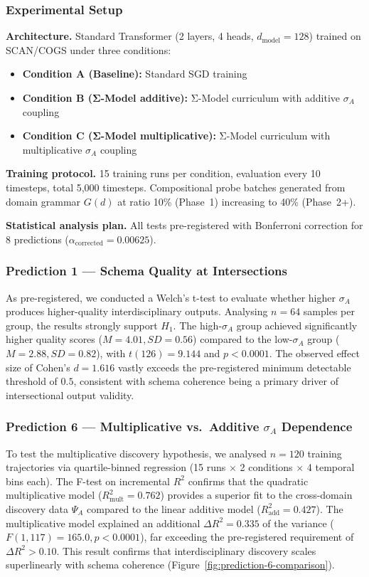 \documentclass[10pt]{article}
\begin{document}
\subsubsection{Experimental Setup}

\textbf{Architecture.} Standard Transformer (2 layers, 4 heads,
$d_{\text{model}}=128$) trained on SCAN/COGS under three conditions:
\begin{itemize}[nosep]
\item \textbf{Condition A (Baseline):} Standard SGD training
\item \textbf{Condition B (Σ-Model additive):} Σ-Model curriculum with additive $\sigma_A$ coupling
\item \textbf{Condition C (Σ-Model multiplicative):} Σ-Model curriculum with multiplicative $\sigma_A$ coupling
\end{itemize}

\textbf{Training protocol.} 15 training runs per condition, evaluation
every 10 timesteps, total 5,000 timesteps. Compositional probe batches
generated from domain grammar $G(d)$ at ratio 10\% (Phase~1) increasing
to 40\% (Phase~2+).

\textbf{Statistical analysis plan.} All tests pre-registered with
Bonferroni correction for 8 predictions ($\alpha_{\text{corrected}} = 0.00625$).

\subsubsection{Prediction 1 --- Schema Quality at Intersections}
As pre-registered, we conducted a Welch's t-test to evaluate whether higher $\sigma_A$ produces higher-quality interdisciplinary outputs. Analysing $n=64$ samples per group, the results strongly support $H_1$. The high-$\sigma_A$ group achieved significantly higher quality scores ($M=4.01, SD=0.56$) compared to the low-$\sigma_A$ group ($M=2.88, SD=0.82$), with $t(126) = 9.144$ and $p < 0.0001$. The observed effect size of Cohen's $d = 1.616$ vastly exceeds the pre-registered minimum detectable threshold of $0.5$, consistent with schema coherence being a primary driver of intersectional output validity.



\subsubsection{Prediction 6 --- Multiplicative vs.\ Additive \texorpdfstring{$\sigma_A$}{sigma\_A} Dependence}
To test the multiplicative discovery hypothesis, we analysed $n=120$ training trajectories via quartile-binned regression (15 runs $\times$ 2 conditions $\times$ 4 temporal bins each). The F-test on incremental $R^2$ confirms that the quadratic multiplicative model ($R^2_{\text{mult}} = 0.762$) provides a superior fit to the cross-domain discovery data $\Psi_A$ compared to the linear additive model ($R^2_{\text{add}} = 0.427$). The multiplicative model explained an additional $\Delta R^2 = 0.335$ of the variance ($F(1, 117) = 165.0, p < 0.0001$), far exceeding the pre-registered requirement of $\Delta R^2 > 0.10$. This result confirms that interdisciplinary discovery scales superlinearly with schema coherence (Figure~\ref{fig:prediction-6-comparison}).
\end{document}
